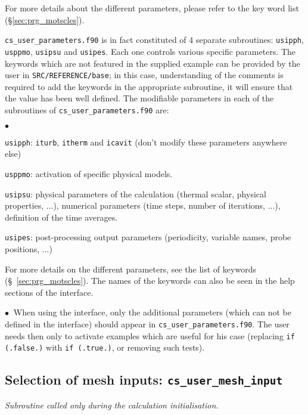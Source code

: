 {{{For more details about the different parameters, please refer to the key
word list (\S\ref{sec:prg_motscles}).

\texttt{cs\_user\_parameters.f90} is in fact constituted of 4 separate subroutines:  \texttt{usipph}, \texttt{usppmo},
\texttt{usipsu} and \texttt{usipes}. Each one controls various
 specific parameters. The keywords which are not featured in the supplied example
can be provided by the user in \texttt{SRC/REFERENCE/base}; in this case,
understanding of the comments is required to add the keywords in the appropriate
subroutine, it will ensure that the value
has been well defined. The modifiable parameters in each of the subroutines of
\texttt{cs\_user\_parameters.f90} are:

\begin{list}{$\bullet$}{}
\item \texttt{usipph}: \texttt{iturb}, \texttt{itherm} and \texttt{icavit} (don't modify these
      parameters anywhere else)
\item \texttt{usppmo}: activation of specific physical models.
\item \texttt{usipsu}: physical parameters of the calculation (thermal scalar, physical
      properties, ...), numerical parameters (time steps, number of iterations, ...),
      definition of the time averages.
\item \texttt{usipes}: post-processing output parameters (periodicity, variable names,
      probe positions, ...)
\end{list}

For more details on the different parameters, see the list of keywords
(\S~\ref{sec:prg_motscles}).
 The names of the keywords can also be seen in the help sections of the interface.

\noindent
$\bullet\ $ When using the interface, only the
additional parameters (which can not be defined in the interface)
should appear in \texttt{cs\_user\_parameters.f90}. The user
needs then only to activate examples which are useful for his
case (replacing \texttt{if (.false.)} with \texttt{if (.true.)},
or removing such tests).

\subsection{Selection of mesh inputs: \textmd{\texttt{cs\_user\_mesh\_input}}}

\noindent
\textit{Subroutine called only during the calculation initialisation.}

}}}
